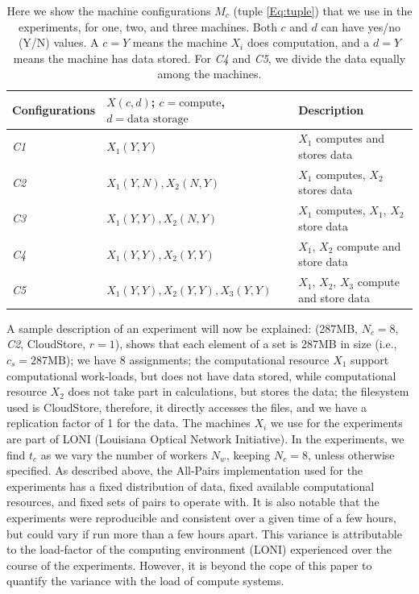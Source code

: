 \documentclass{rspublic}
\begin{document}
\begin{table}
\begin{center}
    \begin{tabular}{ | l | l | l |}
    \hline
    Configurations & $X(c,d)$; $c= \mbox{compute}$, $d=\mbox{data storage}$ & Description  \\ \hline
    \textit{C1} & $X_1(Y,Y)$  & $X_1$ computes and stores data\\ \hline    
    \textit{C2} & $X_1(Y,N), X_2(N,Y)$  & $X_1$ computes, $X_2$ stores data \\ \hline
    \textit{C3} & $X_1(Y,Y), X_2(N,Y)$  & $X_1$ computes, $X_1$, $X_2$ store data \\ \hline
    \textit{C4} & $X_1(Y,Y), X_2(Y,Y)$  & $X_1$, $X_2$ compute and store data \\ \hline
    \textit{C5} & $X_1(Y,Y), X_2(Y,Y), X_3(Y,Y)$  & $X_1$, $X_2$, $X_3$ compute and store data \\ 
    \hline
    \end{tabular}
\end{center}
    \caption{Here we show the machine configurations $M_c$ (tuple
\ref{Eq:tuple}) that we use in the experiments, for one, two, and three
machines. Both $c$ and $d$ can have yes/no (Y/N) values. A $c = Y$ means
the machine $X_i$ does computation, and a $d = Y$ means the machine has
data stored. For \textit{C4} and \textit{C5}, we divide the data equally among the
machines.}
    \label{Tab:Configs}
\end{table}

A sample description of an experiment will now be explained: (287MB,
$N_c=8$, \textit{C2}, CloudStore, $r=1$), shows that each element of a
set is 287MB in size (i.e., $c_s=287\mbox{MB}$); we have 8
assignments; the computational resource $X_1$ support computational
work-loads, but does not have data stored, while computational
resource $X_2$ does not take part in calculations, but stores the
data; the filesystem used is CloudStore, therefore, it directly
accesses the files, and we have a replication factor of 1 for the
data. The machines $X_i$ we use for the experiments are part of LONI
(Louisiana Optical Network Initiative). In the experiments, we find
$t_c$ as we vary the number of workers $N_w$, keeping $N_c=8$, unless
otherwise specified. As described above, the All-Pairs implementation
used for the experiments has a fixed distribution of data, fixed
available computational resources, and fixed sets of pairs to operate
with.  It is also notable that the experiments were reproducible and
consistent over a given time of a few hours, but could vary if run
more than a few hours apart.  This variance is attributable to the
load-factor of the computing environment (LONI) experienced over the
course of the experiments.  However, it is beyond the cope of this
paper to quantify the variance with the load of compute systems.
\end{document}
